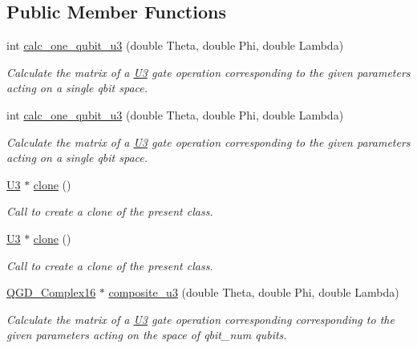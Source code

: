 \subsection*{Public Member Functions}
\begin{DoxyCompactItemize}
\item 
int \hyperlink{class_u3_a9354bcb9b09b0ea92d5015274f0ea08c}{calc\+\_\+one\+\_\+qubit\+\_\+u3} (double Theta, double Phi, double Lambda)
\begin{DoxyCompactList}\small\item\em Calculate the matrix of a \hyperlink{class_u3}{U3} gate operation corresponding to the given parameters acting on a single qbit space. \end{DoxyCompactList}\item 
int \hyperlink{class_u3_a9354bcb9b09b0ea92d5015274f0ea08c}{calc\+\_\+one\+\_\+qubit\+\_\+u3} (double Theta, double Phi, double Lambda)
\begin{DoxyCompactList}\small\item\em Calculate the matrix of a \hyperlink{class_u3}{U3} gate operation corresponding to the given parameters acting on a single qbit space. \end{DoxyCompactList}\item 
\hyperlink{class_u3}{U3} $\ast$ \hyperlink{class_u3_a67abb82c8f8d29fe968cb5d8fc37b392}{clone} ()
\begin{DoxyCompactList}\small\item\em Call to create a clone of the present class. \end{DoxyCompactList}\item 
\hyperlink{class_u3}{U3} $\ast$ \hyperlink{class_u3_a9d49478bb4f195d2f3bc25e82364969c}{clone} ()
\begin{DoxyCompactList}\small\item\em Call to create a clone of the present class. \end{DoxyCompactList}\item 
\hyperlink{struct_q_g_d___complex16}{Q\+G\+D\+\_\+\+Complex16} $\ast$ \hyperlink{class_u3_a48830237072f9cb4804a4ac9b300231d}{composite\+\_\+u3} (double Theta, double Phi, double Lambda)
\begin{DoxyCompactList}\small\item\em Calculate the matrix of a \hyperlink{class_u3}{U3} gate operation corresponding corresponding to the given parameters acting on the space of qbit\+\_\+num qubits. \end{DoxyCompactList}\item 

\end{DoxyCompactItemize}
